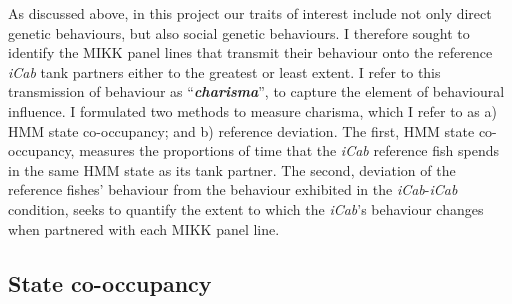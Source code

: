 \documentclass[
]{book}
\begin{document}
As discussed above, in this project our traits of interest include not only direct genetic behaviours, but also social genetic behaviours. I therefore sought to identify the MIKK panel lines that transmit their behaviour onto the reference \emph{\textcolor{iCab_424B4D}{iCab}} tank partners either to the greatest or least extent. I refer to this transmission of behaviour as ``\textbf{\emph{charisma}}'', to capture the element of behavioural influence. I formulated two methods to measure charisma, which I refer to as a) HMM state co-occupancy; and b) reference deviation. The first, HMM state co-occupancy, measures the proportions of time that the \emph{\textcolor{iCab_424B4D}{iCab}} reference fish spends in the same HMM state as its tank partner. The second, deviation of the reference fishes' behaviour from the behaviour exhibited in the \emph{\textcolor{iCab_424B4D}{iCab}}-\emph{\textcolor{iCab_424B4D}{iCab}} condition, seeks to quantify the extent to which the \emph{\textcolor{iCab_424B4D}{iCab}}'s behaviour changes when partnered with each MIKK panel line.

\hypertarget{state-co-occupancy}{%
\subsection{State co-occupancy}\label{state-co-occupancy}}
\end{document}
